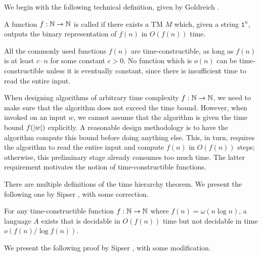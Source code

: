 \documentclass[11pt,twoside=off,numbers=noenddot]{scrbook}
\begin{document}
We begin with the following technical definition, given by Goldreich \cite{goldreich2008computational}.

\begin{definition}
  A function $f : \mathbb N \to \mathbb N$ is called  if there exists a TM $M$ which, given a string $\texttt{1}^n$, outputs the binary representation of $f(n)$ in $O(f(n))$ time.
\end{definition}

\begin{example}
  All the commonly used functions $f(n)$ are time-constructible, as long as $f(n)$ is at least $c \cdot n$ for some constant $c > 0$. No function which is $o(n)$ can be time-constructible unless it is eventually constant, since there is insufficient time to read the entire input.
\end{example}

When designing algorithms of arbitrary time complexity $f : \mathbb N \to \mathbb N$, we need to make sure that the algorithm does not exceed the time bound. However, when invoked on an input $w$, we cannot assume that the algorithm is given the time bound $f(| w |)$ explicitly. A reasonable design methodology is to have the algorithm compute this bound before doing anything else. This, in turn, requires the algorithm to read the entire input and compute $f(n)$ in $O(f(n))$ steps; otherwise, this preliminary stage already consumes too much time. The latter requirement motivates the notion of time-constructible functions.

There are multiple definitions of the time hierarchy theorem. We present the following one by Sipser \cite{sipser2013introduction}, with some correction.

\begin{theorem}
  For any time-constructible function $f : \mathbb N \to \mathbb N$ where $f(n) = \omega(n \log n)$, a language $A$ exists that is decidable in $O(f(n))$ time but not decidable in time $o(f(n) / \log f(n))$.
\end{theorem}

We present the following proof by Sipser \cite{sipser2013introduction}, with some modification.
\end{document}
